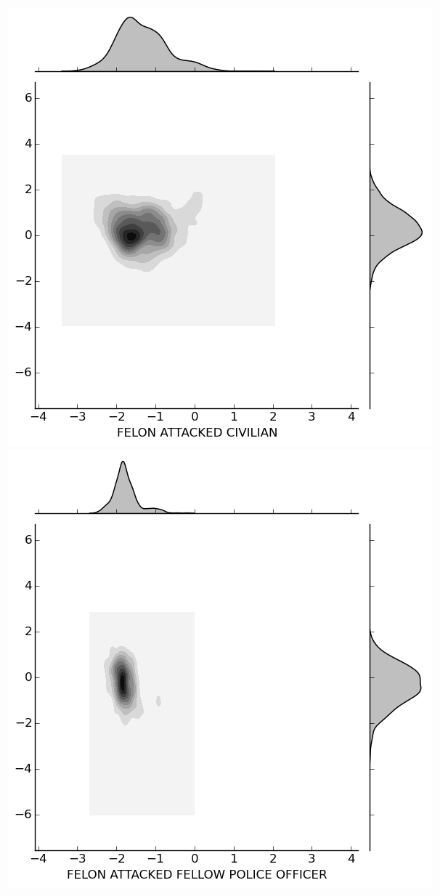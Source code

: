 \documentclass{evanarticle}
\begin{document}
\begin{figure}[H]
  \centering
  \begin{minipage}[b]{0.30\linewidth}
    \includegraphics[width=\linewidth]{images/subcircum/FELON_ATTACKED_CIVILIAN.png}
  \end{minipage}
  \quad
  \begin{minipage}[b]{0.30\linewidth}
    \includegraphics[width=\linewidth]{images/subcircum/FELON_ATTACKED_FELLOW_POLICE_OFFICER.png}

\end{minipage}
\end{figure}
\end{document}
